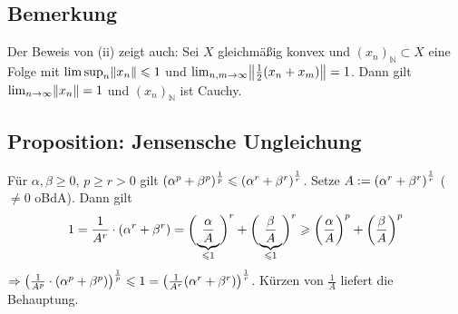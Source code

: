 \subsection{Bemerkung} %
\label{sub:65}
Der Beweis von (ii) zeigt auch: Sei $X$ gleichmäßig konvex und $(x_n)_\mathds{N} \subset X$ eine Folge mit $\limsup_n \norm{x_n}\le 1$ und 
$\lim_{ n,m \to \infty} \norm{\frac{1}{2} (x_n+x_m)}=1$. Dann gilt $\lim_{ n \to \infty} \norm{x_n}=1$ und $(x_n)_{\mathds{N}}$ ist Cauchy.

\subsection{Proposition: Jensensche Ungleichung} %
\label{sub:66}
Für $\alpha,\beta \ge 0$, $p \ge r >0$ gilt $(\alpha^p + \beta^p)^{\frac{1}{p}} \le \enbrace*{\alpha^r + \beta^r}^{\frac{1}{r}}$.
Setze $A := \enbrace*{\alpha^r +\beta^r}^{\frac{1}{r}}$ ($\not=0$ oBdA). Dann gilt 
\[
	1=\frac{1}{A^r} \cdot \enbrace*{\alpha^r+\beta^r} = \enbrace[\bigg]{\underbrace{\frac{\alpha}{A}}_{\le 1}}^r + \enbrace[\bigg]{\underbrace{\frac{\beta}{A}}_{\le 1}}^r
	\ge \enbrace[\bigg]{\frac{\alpha}{A} }^p + \enbrace[\bigg]{\frac{\beta}{A} }^p    
\]
$\Rightarrow \enbrace*{\frac{1}{A^p} \cdot \enbrace*{\alpha^p + \beta^p}}^{\frac{1}{p} } \le 1 = \enbrace*{\frac{1}{A^r} \enbrace*{\alpha^r+ \beta^r}}^{\frac{1}{r} }$. 
Kürzen von $\frac{1}{A}$ liefert die Behauptung. \bewende

